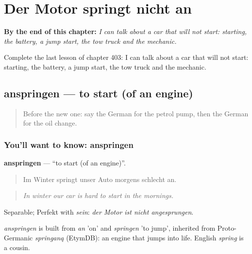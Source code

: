 
\chapter{Der Motor springt nicht an}
\label{ch:ge-der-motor-springt-nicht-an}

\begin{chapteropening}
\textbf{By the end of this chapter:} \emph{I can talk about a car that will not start: starting, the battery, a jump start, the tow truck and the mechanic.}

Complete the last lesson of chapter 403: I can talk about a car that will not start: starting, the battery, a jump start, the tow truck and the mechanic.
\end{chapteropening}

\section[anspringen]{anspringen — to start (of an engine)}

\label{lesson:GE-C403-anspringen}



\begin{quote}
Before the new one: say the German for the petrol pump, then the German for the oil change.
\end{quote}

\subsection*{You'll want to know: anspringen}
\textbf{anspringen} — \textquotedblleft{}to start (of an engine)\textquotedblright{}.

\begin{quote}
Im Winter springt unser Auto morgens schlecht an.
\end{quote}

\begin{quote}
\emph{In winter our car is hard to start in the mornings.}
\end{quote}

Separable; Perfekt with \emph{sein}: \emph{der Motor ist nicht angesprungen}.

\begin{cousinweb}
\emph{anspringen} is built from \emph{an} 'on' and \emph{springen} 'to jump', inherited from Proto-Germanic \emph{springaną} (EtymDB): an engine that jumps into life. English \emph{spring} is a cousin.
\end{cousinweb}

